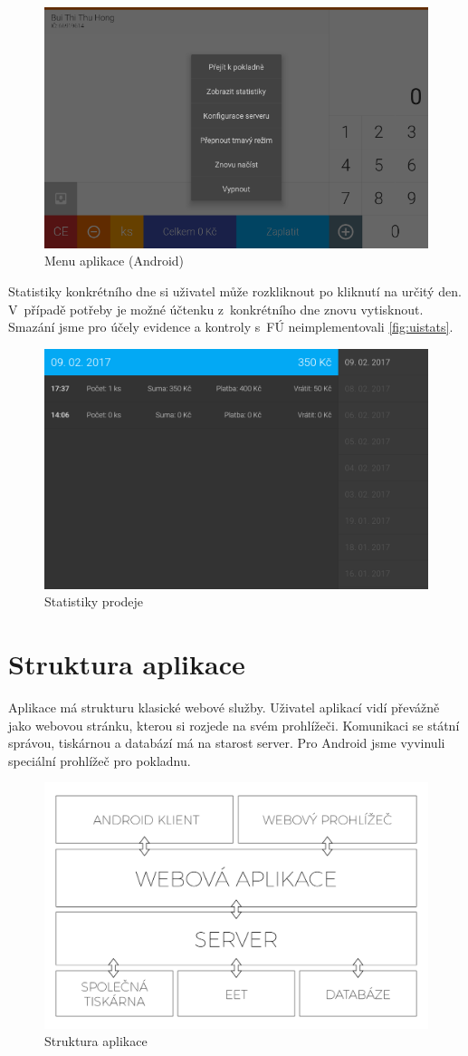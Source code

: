 \documentclass[a4paper,11pt,oneside]{article}
\begin{document}
\begin{figure}[H]
	\centering
	\includegraphics[width=0.7\linewidth]{../ui_menu}
	\caption{Menu aplikace (Android)}
	\label{fig:uimenu}
\end{figure}


Statistiky konkrétního dne si uživatel může rozkliknout po kliknutí na určitý den. V~případě potřeby je možné účtenku z~konkrétního dne znovu vytisknout. Smazání jsme pro účely evidence a kontroly s~FÚ neimplementovali \eqref{fig:uistats}.

\begin{figure}[H]
	\centering
	\includegraphics[width=0.7\linewidth]{../ui_stats}
	\caption{Statistiky prodeje}
	\label{fig:uistats}
\end{figure}

\section{Struktura aplikace}
\label{sec:struktura}
Aplikace má strukturu klasické webové služby. Uživatel aplikací vidí převážně jako webovou stránku, kterou si rozjede na svém prohlížeči. Komunikaci se státní správou, tiskárnou a databází má na starost server. Pro Android jsme vyvinuli speciální prohlížeč pro pokladnu. 

\begin{figure}[H]
	\centering
	\includegraphics[width=0.7\linewidth]{../stack}
	\caption{Struktura aplikace}
	\label{fig:stack}
\end{figure}
\end{document}
